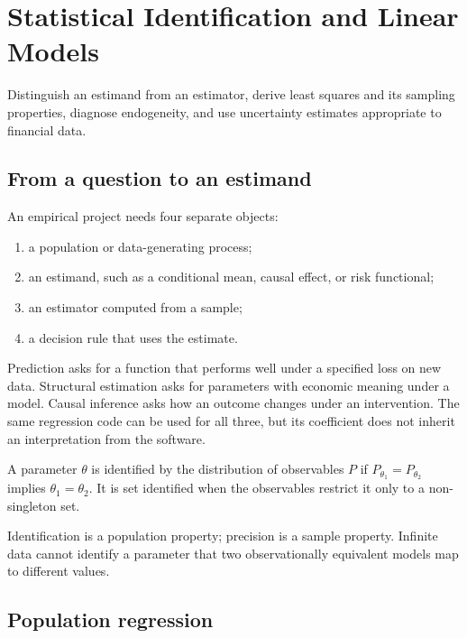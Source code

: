 \chapter{Statistical Identification and Linear Models}

\begin{objectives}
Distinguish an estimand from an estimator, derive least squares and its sampling
properties, diagnose endogeneity, and use uncertainty estimates appropriate to
financial data.
\end{objectives}

\section{From a question to an estimand}

An empirical project needs four separate objects:

\begin{enumerate}
\item a population or data-generating process;
\item an estimand, such as a conditional mean, causal effect, or risk functional;
\item an estimator computed from a sample;
\item a decision rule that uses the estimate.
\end{enumerate}

Prediction asks for a function that performs well under a specified loss on new
data. Structural estimation asks for parameters with economic meaning under a
model. Causal inference asks how an outcome changes under an intervention. The same
regression code can be used for all three, but its coefficient does not inherit an
interpretation from the software.

\begin{definition}[Identification]
A parameter $\theta$ is identified by the distribution of observables $P$ if
$P_{\theta_1}=P_{\theta_2}$ implies $\theta_1=\theta_2$. It is set identified when
the observables restrict it only to a non-singleton set.
\end{definition}

Identification is a population property; precision is a sample property. Infinite
data cannot identify a parameter that two observationally equivalent models map to
different values.

\section{Population regression}

